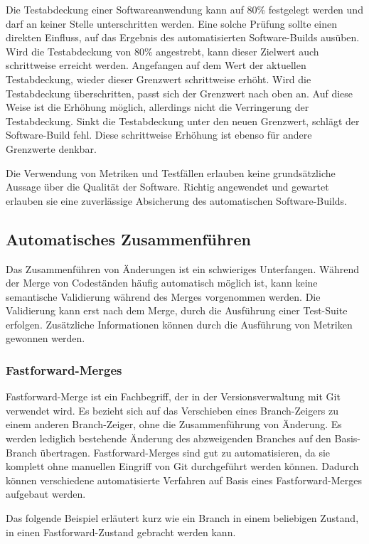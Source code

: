 Die Testabdeckung einer Softwareanwendung kann auf 80\% festgelegt werden und darf an keiner Stelle unterschritten werden. Eine solche Prüfung sollte einen direkten Einfluss, auf das Ergebnis des automatisierten Software-Builds ausüben. Wird die Testabdeckung von 80\% angestrebt, kann dieser Zielwert auch schrittweise erreicht werden. Angefangen auf dem Wert der aktuellen Testabdeckung, wieder dieser Grenzwert schrittweise erhöht. Wird die Testabdeckung überschritten, passt sich der Grenzwert nach oben an. Auf diese Weise ist die Erhöhung möglich, allerdings nicht die Verringerung der Testabdeckung. Sinkt die Testabdeckung unter den neuen Grenzwert, schlägt der Software-Build fehl. Diese schrittweise Erhöhung ist ebenso für andere Grenzwerte denkbar.

Die Verwendung von Metriken und Testfällen erlauben keine grundsätzliche Aussage über die Qualität der Software. Richtig angewendet und gewartet erlauben sie eine zuverlässige Absicherung des automatischen Software-Builds.

\subsection{Automatisches Zusammenführen}

Das Zusammenführen von Änderungen ist ein schwieriges Unterfangen. Während der Merge von Codeständen häufig automatisch möglich ist, kann keine semantische Validierung während des Merges vorgenommen werden. Die Validierung kann erst nach dem Merge, durch die Ausführung einer Test-Suite erfolgen. Zusätzliche Informationen können durch die Ausführung von Metriken gewonnen werden.

\subsubsection{Fastforward-Merges}

Fastforward-Merge ist ein Fachbegriff, der in der Versionsverwaltung mit Git verwendet wird. Es bezieht sich auf das Verschieben eines Branch-Zeigers zu einem anderen Branch-Zeiger, ohne die Zusammenführung von Änderung. Es werden lediglich bestehende Änderung des abzweigenden Branches auf den Basis-Branch übertragen.
Fastforward-Merges sind gut zu automatisieren, da sie komplett ohne manuellen Eingriff von Git durchgeführt werden können. Dadurch können verschiedene automatisierte Verfahren auf Basis eines Fastforward-Merges aufgebaut werden.

Das folgende Beispiel erläutert kurz wie ein Branch in einem beliebigen Zustand, in einen Fastforward-Zustand gebracht werden kann.

